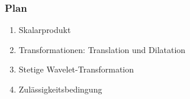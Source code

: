 %
%
%

\begin{frame}
\frametitle{Plan}
\begin{enumerate}
\item<1-> Skalarprodukt
\item<2-> Transformationen: Translation und Dilatation
\item<3-> Stetige Wavelet-Transformation
\item<4-> Zulässigkeitsbedingung
\end{enumerate}
\end{frame}
